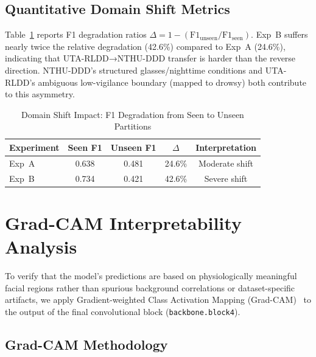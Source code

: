 \documentclass[journal]{IEEEtran}
\begin{document}
\subsection{Quantitative Domain Shift Metrics}
\label{sec:shift_quantitative}
Table~\ref{tab:shift_metrics} reports F1 degradation ratios $\Delta = 1 - (\text{F1}_{\text{unseen}} / \text{F1}_{\text{seen}})$. Exp~B suffers nearly twice the relative degradation (42.6\%) compared to Exp~A (24.6\%), indicating that UTA-RLDD→NTHU-DDD transfer is harder than the reverse direction. NTHU-DDD's structured glasses/nighttime conditions and UTA-RLDD's ambiguous low-vigilance boundary (mapped to drowsy) both contribute to this asymmetry.

\begin{table}[t]
  \caption{Domain Shift Impact: F1 Degradation from Seen to Unseen Partitions}
  \label{tab:shift_metrics}
  \centering
  \small
  \begin{tabular}{lcccc}
    \toprule
    Experiment & Seen F1 & Unseen F1 & $\Delta$ & Interpretation \\
    \midrule
    Exp~A & 0.638 & 0.481 & 24.6\% & Moderate shift \\
    Exp~B & 0.734 & 0.421 & 42.6\% & Severe shift \\
    \bottomrule
  \end{tabular}
\end{table}



\section{Grad-CAM Interpretability Analysis}
\label{sec:gradcam}

To verify that the model's predictions are based on physiologically meaningful facial regions rather than spurious background correlations or dataset-specific artifacts, we apply Gradient-weighted Class Activation Mapping (Grad-CAM)~\cite{selvaraju2017} to the output of the final convolutional block (\texttt{backbone.block4}).

\subsection{Grad-CAM Methodology}
\label{sec:gradcam_method}
\end{document}
